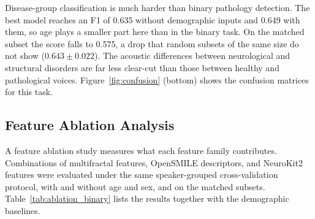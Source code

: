 \documentclass[runningheads]{llncs}
\begin{document}
  Disease-group classification is much harder than binary pathology detection. The best model reaches an F1 of 0.635 without demographic inputs and 0.649 with them, so age plays a smaller part here than in the binary task. On the matched subset the score falls to 0.575, a drop that random subsets of the same size do not show ($0.643 \pm 0.022$). The acoustic differences between neurological and structural disorders are far less clear-cut than those between healthy and pathological voices. Figure~\ref{fig:confusion} (bottom) shows the confusion matrices for this task.


  \subsection{Feature Ablation Analysis}

  A feature ablation study measures what each feature family contributes. Combinations of multifractal features, OpenSMILE descriptors, and NeuroKit2 features were evaluated under the same speaker-grouped cross-validation protocol, with and without age and sex, and on the matched subsets. Table~\ref{tab:ablation_binary} lists the results together with the demographic baselines.
\end{document}
